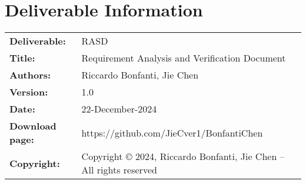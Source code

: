 \documentclass{util/polimi_3i}
\begin{document}


\pagestyle{empty} %
\frontmatter %



\startpreamble
\setcounter{page}{1} %

\chapter*{Deliverable Information} 
\begin{table}[h!]
    \begin{tabu} to \textwidth { X[0.3,r,p] X[0.7,l,p] }
    \hline
    \textbf{Deliverable:} & RASD\\
    \textbf{Title:} & Requirement Analysis and Verification Document \\
    \textbf{Authors:} & Riccardo Bonfanti, Jie Chen \\
    \textbf{Version:} & 1.0 \\ 
    \textbf{Date:} & 22-December-2024 \\
    \textbf{Download page:} & https://github.com/JieCver1/BonfantiChen \\
    \textbf{Copyright:} & Copyright © 2024, Riccardo Bonfanti, Jie Chen – All rights reserved \\
    \hline
    \end{tabu}
    \end{table}
    
\end{document}
